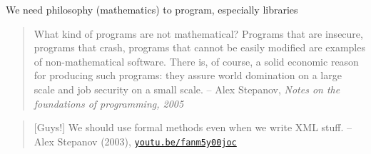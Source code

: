 \documentclass[t,aspectratio=169,handout]{beamer}
\begin{document}
\begin{frame}[label=history3]{We need philosophy (mathematics) to program, especially libraries}
	\begin{quote}
		What kind of programs are not mathematical? Programs that are insecure, programs that
		crash, programs that cannot be easily modified are examples of non-mathematical software.
		There is, of course, a solid economic reason for producing such programs: they assure
		world domination on a large scale and job security on a small scale. -- Alex Stepanov, \emph{Notes on the foundations of programming, 2005}
	\end{quote}

	\noindent\makebox[\linewidth]{\resizebox{0.3333\linewidth}{1pt}{$\bullet$}}\pause

	\begin{quote}
		[Guys!] We should use formal methods even when we write XML stuff. -- Alex Stepanov (2003), \href{https://youtu.be/fanm5y00joc?t=6723}{\texttt{youtu.be/fanm5y00joc}}
	\end{quote}
\end{frame}
\end{document}
